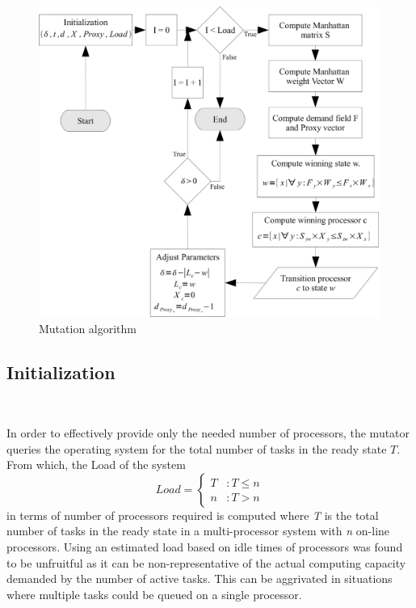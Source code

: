 \begin{figure}[h!]
  \begin{center}
    \includegraphics[height=4in]{figures/Mutation_algo.jpg}
    \caption{Mutation algorithm}
    \label{fig:mutation_algo}
  \end{center}
\end{figure}

\subsection{Initialization}~\label{sec:mut_init}

In order to effectively provide only the needed number of processors, the mutator
queries the operating system for the total number of tasks in the ready state $T$. 
From which, the Load of the system 
\begin{equation}
    Load = \left\{
     \begin{array}{lr}
       T & : T \leq n\\
       n & : T > n
     \end{array}
   \right.
\label{eq:projected_load}
\end{equation}
in terms of number of processors required is computed where \textit{T} is the total number 
of tasks in the ready state in a multi-processor system with \textit{n} on-line processors.
Using an estimated load based on idle times
of processors was found to be unfruitful as it can be non-representative of the actual 
computing capacity demanded by the number of active tasks. This can be aggrivated
in situations where multiple tasks could be queued on a single processor.

